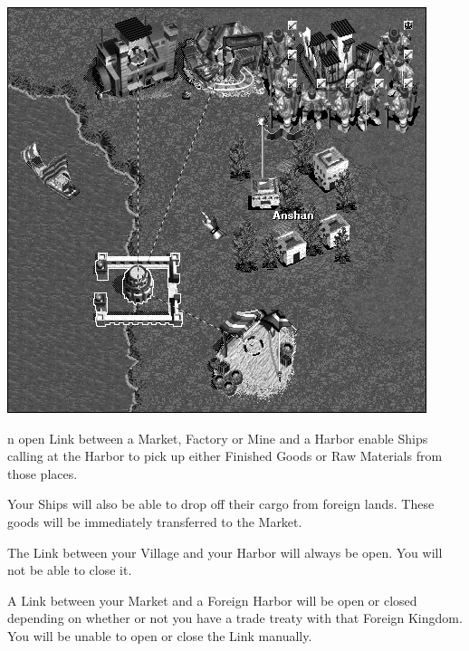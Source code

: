
\begin{center}
	\includegraphics[width=0.7\linewidth]{Ilink_harbor}
\end{center}

n open Link between a Market, Factory or Mine and a Harbor enable Ships calling at the Harbor to pick up either Finished Goods or Raw Materials from those places.

Your Ships will also be able to drop off their cargo from foreign lands. These goods will be immediately transferred to the Market.

The Link between your Village and your Harbor will always be open. You will not be able to close it.

A Link between your Market and a Foreign Harbor will be open or closed depending on whether or not you have a trade treaty with that Foreign Kingdom. You will be unable to open or close the Link manually.
